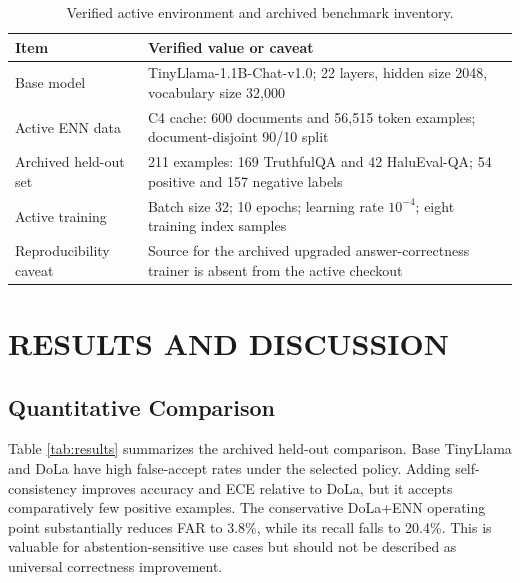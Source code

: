 \documentclass[12pt,a4paper,oneside]{report}
\begin{document}
\begin{table}[H]
\centering
\caption{Verified active environment and archived benchmark inventory.}
\label{tab:inventory}
\begin{tabular}{p{}p{}}
\toprule
Item & Verified value or caveat\\ \midrule
Base model & TinyLlama-1.1B-Chat-v1.0; 22 layers, hidden size 2048, vocabulary size 32,000\\
Active ENN data & C4 cache: 600 documents and 56,515 token examples; document-disjoint 90/10 split\\
Archived held-out set & 211 examples: 169 TruthfulQA and 42 HaluEval-QA; 54 positive and 157 negative labels\\
Active training & Batch size 32; 10 epochs; learning rate $10^{-4}$; eight training index samples\\
Reproducibility caveat & Source for the archived upgraded answer-correctness trainer is absent from the active checkout\\
\bottomrule
\end{tabular}
\end{table}

\chapter{RESULTS AND DISCUSSION}
\section{Quantitative Comparison}
Table \ref{tab:results} summarizes the archived held-out comparison. Base TinyLlama and DoLa have high false-accept rates under the selected policy. Adding self-consistency improves accuracy and ECE relative to DoLa, but it accepts comparatively few positive examples. The conservative DoLa+ENN operating point substantially reduces FAR to 3.8\%, while its recall falls to 20.4\%. This is valuable for abstention-sensitive use cases but should not be described as universal correctness improvement.
\end{document}
